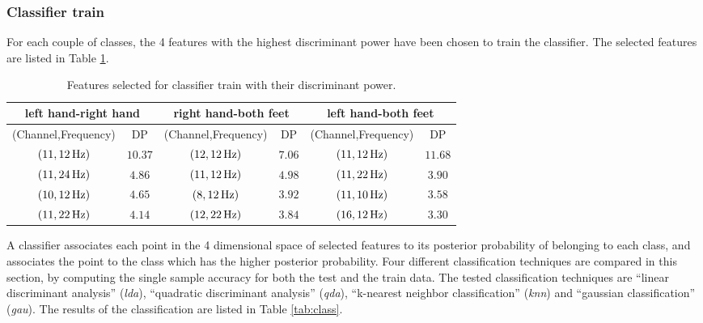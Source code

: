 \subsubsection{Classifier train}
For each couple of classes, the 4 features with the highest discriminant power have been chosen to train the classifier.
The selected features are listed in Table \ref{tab:selFeatures}. \\
\begin{table}
   \centering
   \begin{tabular}{||c c||c c||c c||}
      \hline
      \multicolumn{2}{||c||}{left hand-right hand} & \multicolumn{2}{|c||}{right hand-both feet} & \multicolumn{2}{|c||}{left hand-both feet} \\
      \hline
      (Channel,Frequency)  & DP      & (Channel,Frequency)  & DP     & (Channel,Frequency)  & DP \\
      \hline
      $(11,\unit[12]{Hz})$ & $10.37$ & $(12,\unit[12]{Hz})$ & $7.06$ & $(11,\unit[12]{Hz})$ & $11.68$ \\
      $(11,\unit[24]{Hz})$  & $4.86$  & $(11,\unit[12]{Hz})$ & $4.98$ & $(11,\unit[22]{Hz})$ & $3.90$  \\
      $(10,\unit[12]{Hz})$ & $4.65$  & $(8,\unit[12]{Hz})$  & $3.92$ & $(11,\unit[10]{Hz})$ & $3.58$  \\
      $(11,\unit[22]{Hz})$ & $4.14$  & $(12,\unit[22]{Hz})$ & $3.84$ & $(16,\unit[12]{Hz})$ & $3.30$  \\
      \hline
   \end{tabular}
   \caption{Features selected for classifier train with their discriminant power.}
   \label{tab:selFeatures}
\end{table}
A classifier associates each point in the 4 dimensional space of selected features to its posterior probability of belonging to each class, and associates the point to the class which has the higher posterior probability.
Four different classification techniques are compared in this section, by computing the single sample accuracy for both the test and the train data.
The tested classification techniques are ``linear discriminant analysis'' (\textit{lda}), ``quadratic discriminant analysis'' (\textit{qda}), ``k-nearest neighbor classification'' (\textit{knn}) and ``gaussian classification'' (\textit{gau}).
The results of the classification are listed in Table \ref{tab:class}.

